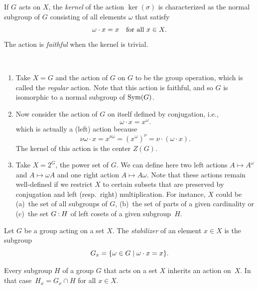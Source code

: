 \begin{defn}
    If\/ $G$ acts on $X$, the \textsl{kernel} of the action $\ker(\sigma)$ is characterized as the normal subgroup of\/ $G$ consisting of all elements $\omega$ that satisfy
    $$
        \omega\cdot x=x\quad\textrm{\upshape for all }x\in X.
    $$
    The action is \textsl{faithful} when the kernel is trivial.
\end{defn}

\begin{xmpls}${}$
\begin{enumerate}[\upshape 1.]
    \item Take $X=G$ and the action of\/ $G$ on $G$ to be the group operation, which is called the \textsl{regular} action. Note that this action is faithful, and so\/ $G$ is isomorphic to a normal subgroup of\/ ${\rm Sym}(G)$.

    \item Now consider the action of\/ $G$ on itself defined by conjugation, i.e., 
    $$
        \omega\cdot x= x^\omega.
    $$
    which is actually a (left) action because
    $$
        \nu\omega\cdot x=x^{\nu\omega}=(x^\omega)^\nu=\nu\cdot(\omega\cdot x).
    $$
    The kernel of this action is the center $Z(G)$.

    \item Take $X=2^G$, the power set of $G$. We can define here two left actions $A\mapsto A^\omega$ and $A\mapsto\omega A$ and one right action $A\mapsto A\omega$. Note that these actions remain well-defined if we restrict $X$ to certain subsets that are preserved by conjugation and left (resp.~right) multiplication. For instance, $X$ could be {\upshape(a)}~the set of all subgroups of\/ $G$, {\upshape(b)}~the set of parts of a given cardinality or {\upshape(c)}~the set $G\mathbin:H$ of left cosets of a given subgroup~$H$.
\end{enumerate}
\end{xmpls}

\begin{defn}
    Let $G$ be a group acting on a set $X$. The \textsl{stabilizer} of an element $x\in X$ is the subgroup
    $$
        G_x = \{\omega\in G\mid \omega\cdot x=x\}.
    $$
\end{defn}

\begin{rem}
    Every subgroup\/ $H$ of a group $G$ that acts on a set $X$ inherits an action on~$X$. In that case~$H_x=G_x\cap H$ for all $x\in X$.
\end{rem}

